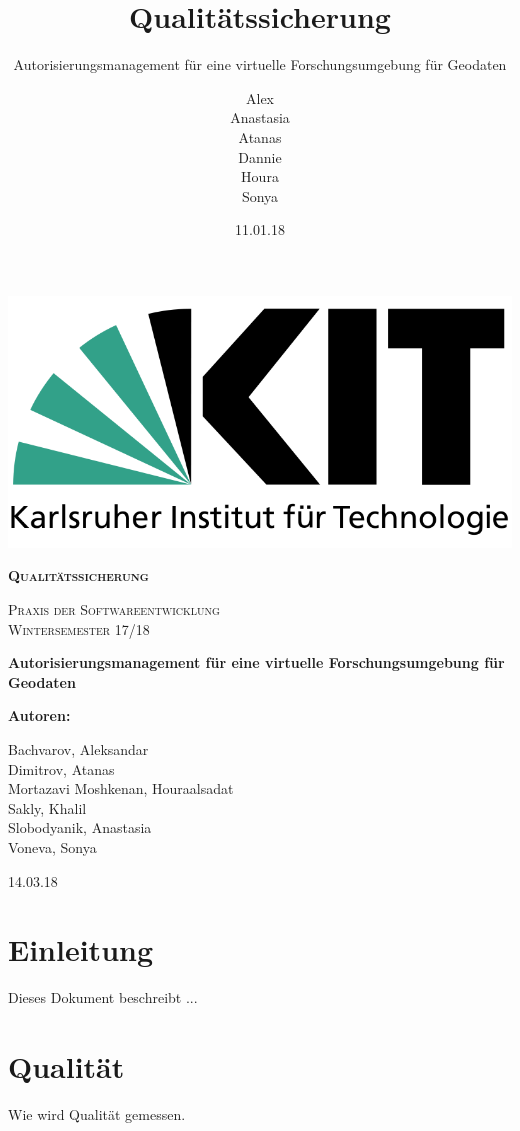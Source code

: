 \documentclass[parskip=full,11pt]{scrartcl}
\title{Qualitätssicherung}
\subtitle{Autorisierungsmanagement für eine virtuelle Forschungsumgebung für Geodaten}
\author{Alex\\Anastasia\\Atanas\\Dannie\\ Houra\\Sonya\\}
\date{11.01.18}
\begin{document}
 
 \begin{titlepage}
 	
 	\begin{center}
 	\includegraphics[width=0.5\linewidth]{res/KITLogo.png}\\
 	\vspace{2cm}
 	{\scshape\LARGE\bfseries Qualitätssicherung \par}
 	\vspace{0.5cm}
 	{\scshape\Large Praxis der Softwareentwicklung\\}
 	\vspace{1cm}
 	{\scshape\Large Wintersemester 17/18\\}
 	\vspace{2cm}
 	{\huge\bfseries Autorisierungsmanagement für eine virtuelle Forschungsumgebung für Geodaten\par}
 	\vspace{2cm}
 	\vfill
 	{\bfseries {\Large Autoren}:\par}
 	{\Large Bachvarov, Aleksandar }\\
 	{\Large Dimitrov, Atanas }\\
 	{\Large Mortazavi Moshkenan, Houraalsadat }\\
 	{\Large Sakly, Khalil }\\
 	{\Large Slobodyanik, Anastasia }\\
 	{\Large Voneva, Sonya}\\
 	\vfill
 	{\large 14.03.18 \par}
 	\end{center}
 \end{titlepage}
 
 \tableofcontents
 \newpage
 \section{Einleitung}
Dieses Dokument beschreibt ...

 \newpage
 \section{Qualität}
 Wie wird Qualität gemessen.
 
\end{document}
